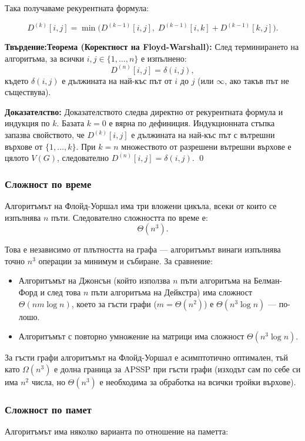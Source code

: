 \documentclass{article}
\renewcommand{\\}{\newline}
\newcommand{\tv}{\textbf{Твърдение:\;}}
\newcommand{\doc}{\textbf{Доказателство: }}
\begin{document}
Така получаваме рекурентната формула:

\[
D^{(k)}[i, j] = \min\bigl(D^{(k-1)}[i, j],\; D^{(k-1)}[i, k] + D^{(k-1)}[k, j]\bigr).
\]

\tv \textbf{Теорема (Коректност на Floyd-Warshall):}
След терминирането на алгоритъма, за всички \(i, j \in \{1, \dots, n\}\) е изпълнено:
\[
D^{(n)}[i, j] = \delta(i, j),
\]
където \(\delta(i, j)\) е дължината на най-къс път от \(i\) до \(j\) (или \(\infty\), ако такъв път не съществува).

\doc
Доказателството следва директно от рекурентната формула и индукция по \(k\). Базата \(k = 0\) е вярна по дефиниция. Индукционната стъпка запазва свойството, че \(D^{(k)}[i, j]\) е дължината на най-къс път с вътрешни върхове от \(\{1, \dots, k\}\). При \(k = n\) множеството от разрешени вътрешни върхове е цялото \(V(G)\), следователно \(D^{(n)}[i, j] = \delta(i, j)\). \qed

\subsubsection{Сложност по време}

Алгоритъмът на Флойд-Уоршал има три вложени цикъла, всеки от които се изпълнява \(n\) пъти. Следователно сложността по време е:
\[
\Theta(n^3).
\]

Това е независимо от плътността на графа — алгоритъмът винаги изпълнява точно \(n^3\) операции за минимум и събиране. За сравнение:
\begin{itemize}
\item Алгоритъмът на Джонсън (който използва \(n\) пъти алгоритъма на Белман-Форд и след това \(n\) пъти алгоритъма на Дейкстра) има сложност \(\Theta(n m \log n)\), което за гъсти графи (\(m = \Theta(n^2)\)) е \(\Theta(n^3 \log n)\) — по-лошо.
\item Алгоритъмът с повторно умножение на матрици има сложност \(\Theta(n^3 \log n)\).
\end{itemize}
За гъсти графи алгоритъмът на Флойд-Уоршал е асимптотично оптимален, тъй като \(\Omega(n^3)\) е долна граница за APSSP при гъсти графи (изходът сам по себе си има \(n^2\) числа, но \(\Theta(n^3)\) е необходима за обработка на всички тройки върхове).

\subsubsection{Сложност по памет}

Алгоритъмът има няколко варианта по отношение на паметта:
\end{document}

